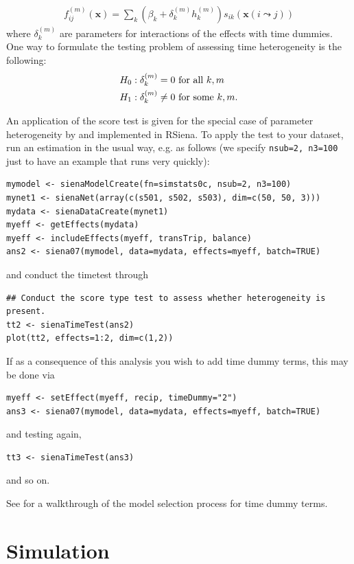 \documentclass[a4paper,fleqn]{article}
\newcommand{\+}{\, + \,}
\begin{document}
{\begin{align}
f^{(m)}_{ij}(\mathbf{x})= \sum_k (\beta_k + \delta_k^{(m)} h_k^{(m)})
s_{ik}(\mathbf{x}(i \leadsto j))
\label{eq:fmij}
\end{align}
where $\delta_k^{(m)}$ are parameters for interactions of the effects
with time dummies. One way
to formulate the testing problem of assessing time heterogeneity is the
following:
\begin{align}
H_0:\delta_k^{(m)} = 0 & \mbox{~for all~} k,m \notag\\
H_1:\delta_k^{(m)} \neq 0 & \mbox{ for some } k,m .
\label{hyptest}
\end{align}

An application of the score test is given for the special case of parameter
heterogeneity by \citet{Lospinoso2010a} and implemented in RSiena.  To apply the
test to your dataset, run an estimation in the usual way, e.g. as follows
(we specify \texttt{nsub=2, n3=100} just to have an example that runs
very quickly):
\begin{verbatim}
mymodel <- sienaModelCreate(fn=simstats0c, nsub=2, n3=100)
mynet1 <- sienaNet(array(c(s501, s502, s503), dim=c(50, 50, 3)))
mydata <- sienaDataCreate(mynet1)
myeff <- getEffects(mydata)
myeff <- includeEffects(myeff, transTrip, balance)
ans2 <- siena07(mymodel, data=mydata, effects=myeff, batch=TRUE)
\end{verbatim}
and conduct the timetest through
\begin{verbatim}
## Conduct the score type test to assess whether heterogeneity is present.
tt2 <- sienaTimeTest(ans2)
plot(tt2, effects=1:2, dim=c(1,2))
\end{verbatim}
If as a consequence of this analysis you wish to add time dummy terms,
this may be done via
\begin{verbatim}
myeff <- setEffect(myeff, recip, timeDummy="2")
ans3 <- siena07(mymodel, data=mydata, effects=myeff, batch=TRUE)
\end{verbatim}
and testing again,
\begin{verbatim}
tt3 <- sienaTimeTest(ans3)
\end{verbatim}
and so on.

See \citet{Lospinoso2010b} for a walkthrough of the model selection process
for time dummy terms.

\begin{print}
\newpage
\end{print}
\section{Simulation}

}
\end{document}
